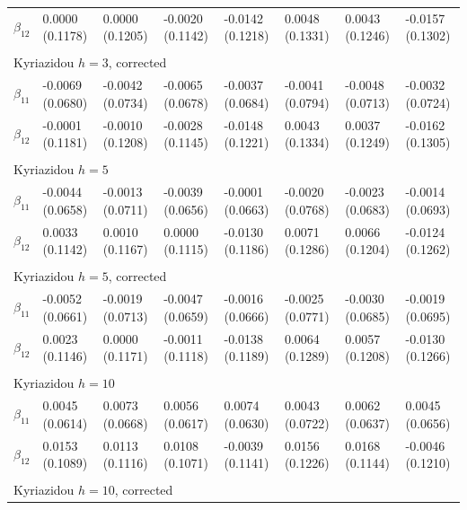 \begin{table}
\begin{adjustwidth}{-.5in}{-.5in}
\begin{tabular}{p{3cm}p{1.3cm}p{1.3cm}p{1.3cm}p{1.3cm}p{1.3cm}p{1.3cm}p{1.3cm}}
    $\beta_{12}$  & 0.0000 (0.1178) & 0.0000 (0.1205) & -0.0020 (0.1142) & -0.0142 (0.1218) & 0.0048 (0.1331) &  0.0043 (0.1246) & -0.0157 (0.1302)\\
    & & & & & & & \\
    \hline
    \multicolumn{8}{l}{Kyriazidou $h=3$, corrected} \\
   \hline
    $\beta_{11}$  & -0.0069 (0.0680) & -0.0042 (0.0734) & -0.0065 (0.0678) &  -0.0037 (0.0684) & -0.0041 (0.0794) & -0.0048 (0.0713) & -0.0032 (0.0724) \\
    $\beta_{12}$  & -0.0001 (0.1181) & -0.0010 (0.1208) & -0.0028 (0.1145) &  -0.0148 (0.1221) & 0.0043 (0.1334) &  0.0037 (0.1249) & -0.0162 (0.1305)\\
             & & & & & & & \\
    \hline
    \multicolumn{8}{l}{Kyriazidou $h=5$} \\
   \hline
    $\beta_{11}$  & -0.0044 (0.0658) & -0.0013 (0.0711) & -0.0039 (0.0656) & -0.0001 (0.0663) & -0.0020 (0.0768) & -0.0023 (0.0683) & -0.0014 (0.0693)\\
    $\beta_{12}$  & 0.0033 (0.1142) & 0.0010 (0.1167) & 0.0000 (0.1115) &  -0.0130 (0.1186) & 0.0071 (0.1286) & 0.0066 (0.1204) & -0.0124 (0.1262) \\
    & & & & & & & \\
    \hline
    \multicolumn{8}{l}{Kyriazidou $h=5$, corrected} \\
   \hline
    $\beta_{11}$  & -0.0052 (0.0661) & -0.0019 (0.0713) & -0.0047 (0.0659) &  -0.0016 (0.0666) & -0.0025 (0.0771) & -0.0030 (0.0685) & -0.0019 (0.0695) \\
    $\beta_{12}$  &  0.0023 (0.1146) & 0.0000 (0.1171) & -0.0011 (0.1118) &  -0.0138 (0.1189) & 0.0064 (0.1289) & 0.0057 (0.1208) & -0.0130 (0.1266) \\
                 & & & & & & & \\
    \hline
    \multicolumn{8}{l}{Kyriazidou $h=10$} \\
   \hline
    $\beta_{11}$  & 0.0045 (0.0614) & 0.0073 (0.0668) & 0.0056 (0.0617) &  0.0074 (0.0630) & 0.0043 (0.0722) &  0.0062 (0.0637) & 0.0045 (0.0656) \\
    $\beta_{12}$  & 0.0153 (0.1089) & 0.0113 (0.1116) & 0.0108 (0.1071) &  -0.0039 (0.1141) & 0.0156 (0.1226) & 0.0168 (0.1144) & -0.0046 (0.1210)\\
    & & & & & & & \\
    \hline
    \multicolumn{8}{l}{Kyriazidou $h=10$, corrected} \\

\end{tabular}
\end{adjustwidth}
\end{table}
